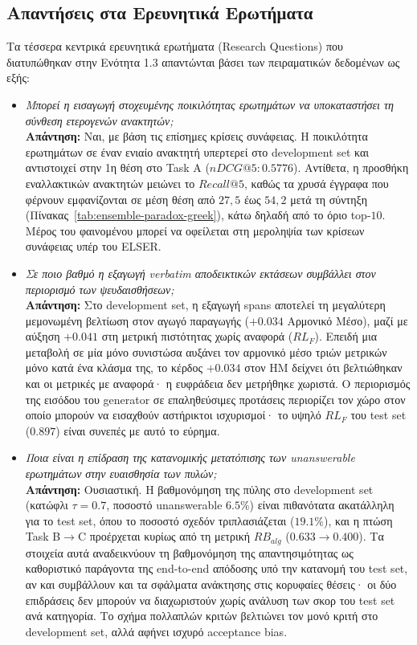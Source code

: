 \subsection{Απαντήσεις στα Ερευνητικά Ερωτήματα}

Τα τέσσερα κεντρικά ερευνητικά ερωτήματα (Research Questions) που διατυπώθηκαν στην Ενότητα 1.3 απαντώνται βάσει των πειραματικών δεδομένων ως εξής:
\begin{itemize}
    \item[\textbf{RQ1:}] \textit{Μπορεί η εισαγωγή στοχευμένης ποικιλότητας ερωτημάτων να υποκαταστήσει τη σύνθεση ετερογενών ανακτητών;} \\
    \textbf{Απάντηση:} Ναι, με βάση τις επίσημες κρίσεις συνάφειας. Η ποικιλότητα ερωτημάτων σε έναν ενιαίο ανακτητή υπερτερεί στο development set και αντιστοιχεί στην 1η θέση στο Task A ($nDCG@5: 0.5776$). Αντίθετα, η προσθήκη εναλλακτικών ανακτητών μειώνει το $Recall@5$, καθώς τα χρυσά έγγραφα που φέρνουν εμφανίζονται σε μέση θέση από $27{,}5$ έως $54{,}2$ μετά τη σύντηξη (Πίνακας~\ref{tab:ensemble-paradox-greek}), κάτω δηλαδή από το όριο top-$10$. Μέρος του φαινομένου μπορεί να οφείλεται στη μεροληψία των κρίσεων συνάφειας υπέρ του ELSER.
    \item[\textbf{RQ2:}] \textit{Σε ποιο βαθμό η εξαγωγή verbatim αποδεικτικών εκτάσεων συμβάλλει στον περιορισμό των ψευδαισθήσεων;} \\
    \textbf{Απάντηση:} Στο development set, η εξαγωγή spans αποτελεί τη μεγαλύτερη μεμονωμένη βελτίωση στον αγωγό παραγωγής ($+0.034$ Αρμονικό Μέσο), μαζί με αύξηση $+0.041$ στη μετρική πιστότητας χωρίς αναφορά ($RL_F$). Επειδή μια μεταβολή σε μία μόνο συνιστώσα αυξάνει τον αρμονικό μέσο τριών μετρικών μόνο κατά ένα κλάσμα της, το κέρδος $+0.034$ στον HM δείχνει ότι βελτιώθηκαν και οι μετρικές με αναφορά· η ευφράδεια δεν μετρήθηκε χωριστά. Ο περιορισμός της εισόδου του generator σε επαληθεύσιμες προτάσεις περιορίζει τον χώρο στον οποίο μπορούν να εισαχθούν αστήρικτοι ισχυρισμοί· το υψηλό $RL_F$ του test set ($0.897$) είναι συνεπές με αυτό το εύρημα.
    \item[\textbf{RQ3:}] \textit{Ποια είναι η επίδραση της κατανομικής μετατόπισης των unanswerable ερωτημάτων στην ευαισθησία των πυλών;} \\
    \textbf{Απάντηση:} Ουσιαστική. Η βαθμονόμηση της πύλης στο development set (κατώφλι $\tau{=}0.7$, ποσοστό unanswerable $6.5\%$) είναι πιθανότατα ακατάλληλη για το test set, όπου το ποσοστό σχεδόν τριπλασιάζεται ($19.1\%$), και η πτώση Task B$\rightarrow$C προέρχεται κυρίως από τη μετρική $RB_{alg}$ ($0.633 \rightarrow 0.400$). Τα στοιχεία αυτά αναδεικνύουν τη βαθμονόμηση της απαντησιμότητας ως καθοριστικό παράγοντα της end-to-end απόδοσης υπό την κατανομή του test set, αν και συμβάλλουν και τα σφάλματα ανάκτησης στις κορυφαίες θέσεις· οι δύο επιδράσεις δεν μπορούν να διαχωριστούν χωρίς ανάλυση των σκορ του test set ανά κατηγορία. Το σχήμα πολλαπλών κριτών βελτιώνει τον μονό κριτή στο development set, αλλά αφήνει ισχυρό acceptance bias.

\end{itemize}
